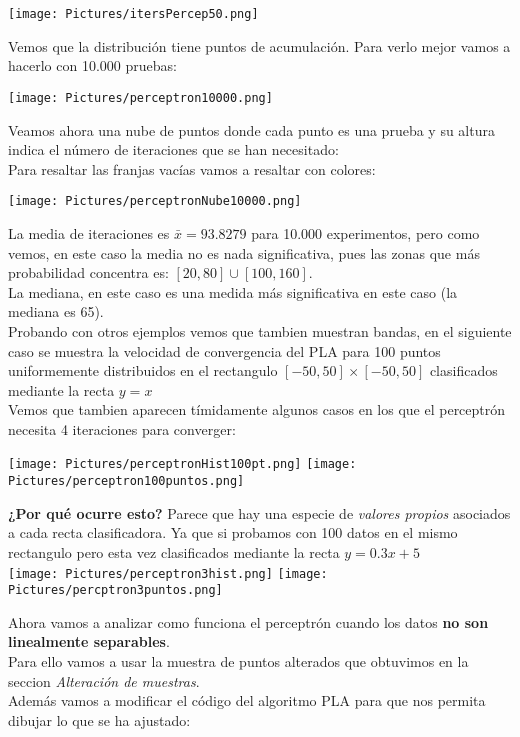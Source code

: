 \documentclass[11pt,fleqn]{book} %
\begin{document}
\texttt{[image: Pictures/itersPercep50.png]}

Vemos que la distribución tiene puntos de acumulación. Para verlo mejor vamos a hacerlo con 10.000 pruebas:

\texttt{[image: Pictures/perceptron10000.png]}

Veamos ahora una nube de puntos donde cada punto es una prueba y su altura indica el número de iteraciones que se han necesitado:\\
Para resaltar las franjas vacías vamos a resaltar con colores:

\texttt{[image: Pictures/perceptronNube10000.png]}

La media de iteraciones es $\bar{x} = 93.8279$ para 10.000 experimentos, pero como vemos, en este caso la media no es nada significativa, pues las zonas que más probabilidad concentra es: $[20,80] \cup [100, 160]$.\\
La mediana, en este caso es una medida más significativa en este caso (la mediana es 65).\\

Probando con otros ejemplos vemos que tambien muestran bandas, en el siguiente caso se muestra la velocidad de convergencia del PLA para 100 puntos uniformemente distribuidos en el rectangulo 
$[-50, 50]\times[-50,50]$ clasificados mediante la recta $ y=x $\\
Vemos que tambien aparecen tímidamente algunos casos en los que el perceptrón necesita 4 iteraciones para converger:

\texttt{[image: Pictures/perceptronHist100pt.png]}
\texttt{[image: Pictures/perceptron100puntos.png]}

\textbf{¿Por qué ocurre esto?} Parece que hay una especie de \textit{valores propios} asociados a cada recta clasificadora. Ya que si probamos con 100 datos en el mismo rectangulo pero esta vez clasificados mediante la recta $y = 0.3x + 5$\\

\texttt{[image: Pictures/perceptron3hist.png]}
\texttt{[image: Pictures/percptron3puntos.png]}


\pagebreak
Ahora vamos a analizar como funciona el perceptrón cuando los datos \textbf{no son linealmente separables}.\\
Para ello vamos a usar la muestra de puntos alterados que obtuvimos en la seccion \textit{Alteración de muestras}.\\
Además vamos a modificar el código del algoritmo PLA para que nos permita dibujar lo que se ha ajustado:
\end{document}
